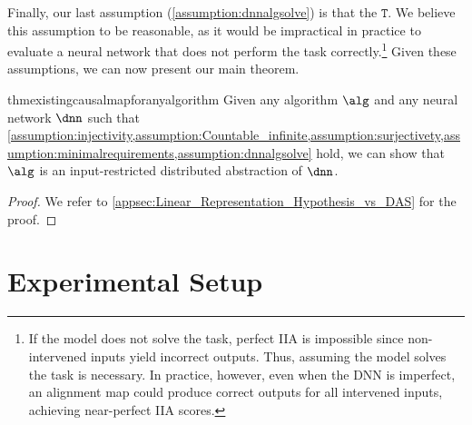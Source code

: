 \documentclass{article}
\newcommand{\ftask}{\mathtt{T}}
\newcommand{\mlpweights}{\mathbf{W}}
\newcommand{\dataset}{\mathcal{D}}
\newcommand{\dimension}{d}
\newcommand{\causalmap}{\phi}
\begin{document}
Finally, our last assumption (\cref{assumption:dnnalgsolve}) is that the  $\ftask$. 
We believe this assumption to be reasonable, as it would be impractical in practice to evaluate a neural network that does not perform the task correctly.\footnote{If the model does not solve the task, perfect IIA is impossible since non-intervened inputs yield incorrect outputs. Thus, assuming the model solves the task is necessary. In practice, however, even when the DNN is imperfect, an alignment map could produce correct outputs for all intervened inputs, achieving near-perfect IIA scores.}
Given these assumptions, we can now present our main theorem.

\begin{restatable}{thm}{existingcausalmapforanyalgorithm}\label{theorem:existing_causalmap_for_any_algorithm}
    Given any algorithm $\alg$ and any neural network $\dnn$ such that  \cref{assumption:injectivity,assumption:Countable_infinite,assumption:surjectivety,assumption:minimalrequirements,assumption:dnnalgsolve} hold, we can show that $\alg$ is an input-restricted distributed abstraction of $\dnn$.
\end{restatable}
\vspace{-10pt}

\begin{proof}
    We refer to \cref{appsec:Linear_Representation_Hypothesis_vs_DAS} for the proof.
\end{proof}

\vspace{-5pt}
\section{Experimental Setup}
\vspace{-2pt}

\newcommand{\TrainingSet}{\dataset_{\mathtt{train}}}
\newcommand{\EvalSet}{\dataset_{\mathtt{eval}}}
\newcommand{\TestingSet}{\dataset_{\mathtt{test}}}
\newcommand{\TrainingSetDAS}{\dataset_{\mathtt{train}}^{\mathtt{DAS}}}
\newcommand{\EvalSetDAS}{\dataset_{\mathtt{eval}}^{\mathtt{DAS}}}
\newcommand{\TestingSetDAS}{\dataset_{\mathtt{test}}^{\mathtt{DAS}}}

\newcommand{\orthogonalmatrix}{\mlpweights_{\mathtt{orth}}}
\newcommand{\causalmapidentity}{\causalmap^{\mathtt{id}}}
\newcommand{\Rotation}{\causalmap^{\mathtt{lin}}}
\newcommand{\RevNet}{\causalmap^{\mathtt{nonlin}}}
\newcommand{\zeromatrix}{\mathbf{0}}
\newcommand{\RevNetHiddenDim}{\dimension_{\mathtt{h}}}
\newcommand{\RevNetBlocks}{K}
\end{document}
